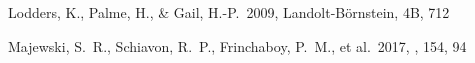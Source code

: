 \documentclass[twocolumn,twocolappendix]{aastex63}
\begin{document}
\begin{thebibliography}{}
 Lodders, K., Palme, H., \& Gail, H.-P.\ 2009, Landolt-B\"ornstein, 4B, 712

















 Majewski, S.~R., Schiavon, R.~P., Frinchaboy, P.~M., et al.\ 2017, \aj, 154, 94















\end{thebibliography}
\end{document}

